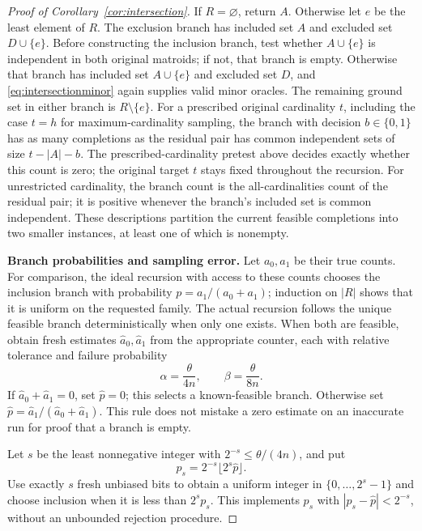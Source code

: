 \documentclass[11pt]{article}
\theoremstyle{definition}
\begin{document}
\begin{proof}[Proof of Corollary~\ref{cor:intersection}]
If $R=\varnothing$, return $A$.  Otherwise let $e$ be the least element
of $R$.  The exclusion branch has included
set $A$ and excluded set $D\cup\{e\}$.  Before constructing the
inclusion branch, test whether
$A\cup\{e\}$ is independent in both original matroids; if not, that
branch is empty.  Otherwise that branch has included set $A\cup\{e\}$
and excluded set $D$, and
\eqref{eq:intersectionminor} again supplies valid minor oracles.
The remaining ground set in either branch is $R\setminus\{e\}$.
For a prescribed original cardinality $t$, including the case $t=h$
for maximum-cardinality sampling, the branch with decision
$b\in\{0,1\}$ has as many completions as the residual pair has common
independent sets of size $t-|A|-b$.  The prescribed-cardinality
pretest above decides exactly whether this count is zero; the original
target $t$ stays fixed throughout the recursion.  For
unrestricted cardinality, the branch count is the all-cardinalities
count of the residual pair; it is positive whenever the branch's
included set is common independent.  These descriptions partition the
current feasible completions into two smaller instances, at least one
of which is nonempty.

\textbf{Branch probabilities and sampling error.}
Let $a_0,a_1$ be their true counts.  For comparison, the ideal
recursion with access to these counts chooses the inclusion branch with probability
$p=a_1/(a_0+a_1)$; induction on $|R|$ shows that it is uniform on the
requested family.  The actual recursion follows the unique feasible
branch deterministically when only one exists.  When both are feasible,
obtain fresh estimates $\widehat a_0,\widehat a_1$ from the appropriate
counter, each with relative tolerance and failure probability
\[
 \alpha=\frac{\theta}{4n},\qquad
 \beta=\frac{\theta}{8n}.
\]
If $\widehat a_0+\widehat a_1=0$, set $\widehat p=0$; this selects a
known-feasible branch.  Otherwise set
$\widehat p=\widehat a_1/(\widehat a_0+\widehat a_1)$.
This rule does not mistake a zero estimate on an inaccurate run for
proof that a branch is empty.

Let $s$ be the least nonnegative integer with
$2^{-s}\le\theta/(4n)$, and put
\[
 p_s=2^{-s}\lfloor 2^s\widehat p\rfloor.
\]
Use exactly $s$ fresh unbiased bits to obtain a uniform integer in
$\{0,\ldots,2^s-1\}$ and choose inclusion when it is less than
$2^sp_s$.  This implements $p_s$ with
$|p_s-\widehat p|<2^{-s}$, without an unbounded rejection procedure.


\end{proof}
\end{document}
